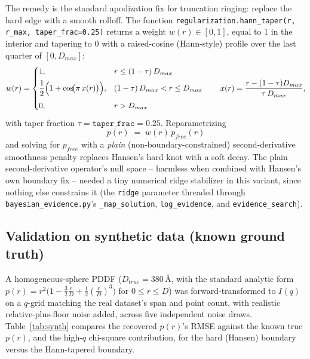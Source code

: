 \documentclass[11pt,a4paper]{article}
\begin{document}
The remedy is the standard apodization fix for truncation ringing:
replace the hard edge with a smooth rolloff. The function
\texttt{regularization.hann\_taper(r, r\_max, taper\_frac=0.25)}
returns a weight $w(r) \in [0,1]$, equal to 1 in the interior and
tapering to 0 with a raised-cosine (Hann-style) profile over the last
quarter of $[0, D_{max}]$:
\begin{equation}
  w(r) =
  \begin{cases}
    1, & r \le (1-\tau)\,D_{max} \\[4pt]
    \dfrac{1}{2}\Bigl(1 + \cos\!\bigl(\pi\, x(r)\bigr)\Bigr), &
      (1-\tau)\,D_{max} < r \le D_{max} \\[8pt]
    0, & r > D_{max}
  \end{cases}
  \qquad
  x(r) = \frac{r - (1-\tau)D_{max}}{\tau\, D_{max}} ,
  \label{eq:hann-taper}
\end{equation}
with taper fraction $\tau = \texttt{taper\_frac} = 0.25$. Reparametrizing
\begin{equation}
  p(r) \;=\; w(r)\, p_{free}(r)
\end{equation}
and solving for $p_{free}$ with a \emph{plain} (non-boundary-constrained)
second-derivative smoothness penalty replaces Hansen's hard knot with
a soft decay. The plain second-derivative operator's null space --
harmless when combined with Hansen's own boundary fix -- needed a
tiny numerical ridge stabilizer in this variant, since nothing else
constrains it (the \texttt{ridge} parameter threaded through
\texttt{bayesian\_evidence.py}'s \texttt{\_map\_solution},
\texttt{log\_evidence}, and \texttt{evidence\_search}).

\subsection{Validation on synthetic data (known ground truth)}

A homogeneous-sphere PDDF ($D_{true} = 380$\,\AA, with the standard
analytic form $p(r) = r^2\bigl(1 - \tfrac{3}{2}\tfrac{r}{D} +
\tfrac{1}{2}(\tfrac{r}{D})^3\bigr)$ for $0 \le r \le D$) was
forward-transformed to $I(q)$ on a $q$-grid matching the real
dataset's span and point count, with realistic relative-plus-floor
noise added, across five independent noise draws. Table~\ref{tab:synth}
compares the recovered $p(r)$'s RMSE against the known true $p(r)$,
and the high-$q$ chi-square contribution, for the hard (Hansen)
boundary versus the Hann-tapered boundary.
\end{document}
